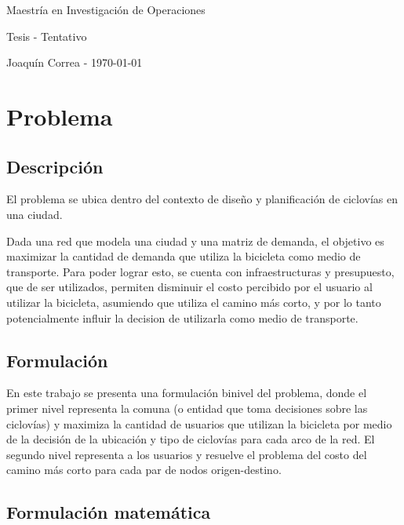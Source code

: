 \documentclass{article}
\begin{document}
  \begin{center}
    {\sc \large Maestría en Investigación de Operaciones}
    
    {\sc \large Tesis - Tentativo}
    \linebreak

    {\rm Joaquín Correa - \today}
  \end{center}

  \section*{Problema}

  \subsection*{Descripción}

  El problema se ubica dentro del contexto de diseño y planificación de ciclovías en una ciudad.

  Dada una red que modela una ciudad y una matriz de demanda, el objetivo es maximizar la cantidad de demanda que utiliza la bicicleta como medio de transporte. Para poder lograr esto, se cuenta con infraestructuras y presupuesto, que de ser utilizados, permiten disminuir el costo percibido por el usuario al utilizar la bicicleta, asumiendo que utiliza el camino más corto, y por lo tanto potencialmente influir la decision de utilizarla como medio de transporte.

  \subsection*{Formulación}

  En este trabajo se presenta una formulación binivel del problema, donde el primer nivel representa la comuna (o entidad que toma decisiones sobre las ciclovías) y maximiza la cantidad de usuarios que utilizan la bicicleta por medio de la decisión de la ubicación y tipo de ciclovías para cada arco de la red. El segundo nivel representa a los usuarios y resuelve el problema del costo del camino más corto para cada par de nodos origen-destino.

  \subsection*{Formulación matemática}
\end{document}
